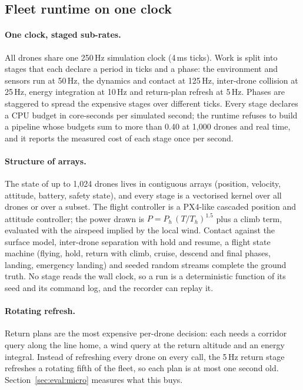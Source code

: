 \subsection{Fleet runtime on one clock}\label{sec:design:runtime}

\paragraph{One clock, staged sub-rates.} All drones share one 250\,Hz simulation clock (4\,ms ticks). Work is split
into stages that each declare a period in ticks and a phase: the environment and sensors run at 50\,Hz, the
dynamics and contact at 125\,Hz, inter-drone collision at 25\,Hz, energy integration at 10\,Hz and return-plan refresh
at 5\,Hz. Phases are staggered to spread the expensive stages over different ticks. Every stage declares a CPU budget in
core-seconds per simulated second; the runtime refuses to build a pipeline whose budgets sum to more than 0.40 at
1,000 drones and real time, and it reports the measured cost of each stage once per second.

\paragraph{Structure of arrays.} The state of up to 1,024 drones lives in contiguous arrays (position, velocity,
attitude, battery, safety state), and every stage is a vectorised kernel over all drones or over a subset. The flight
controller is a PX4-like cascaded position and attitude controller; the power drawn is
$P = P_{h}\,(T/T_{h})^{1.5}$ plus a climb term, evaluated with the airspeed implied by the local wind. Contact against
the surface model, inter-drone separation with hold and resume, a flight state machine (flying, hold, return with
climb, cruise, descend and final phases, landing, emergency landing) and seeded random streams complete the ground
truth. No stage reads the wall clock, so a run is a deterministic function of its seed and its command log, and the
recorder can replay it.

\paragraph{Rotating refresh.} Return plans are the most expensive per-drone decision: each needs a corridor query
along the line home, a wind query at the return altitude and an energy integral. Instead of refreshing every drone on
every call, the 5\,Hz return stage refreshes a rotating fifth of the fleet, so each plan is at most one second old. Section~\ref{sec:eval:micro}
measures what this buys.

